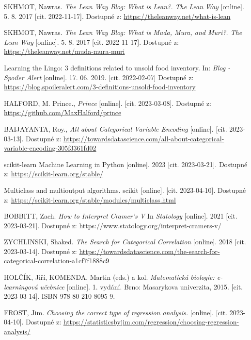 \begin{thebibliography}{1}
SKHMOT, Nawras. \textit{The Lean Way Blog: What is Lean?. The Lean Way} [online]. 5. 8. 2017 [cit. 2022-11-17]. Dostupné z: \url{https://theleanway.net/what-is-lean}

SKHMOT, Nawras. \textit{The Lean Way Blog: What is Muda, Mura, and Muri?. The Lean Way} [online]. 5. 8. 2017 [cit. 2022-11-17]. Dostupné z:
 \url{https://theleanway.net/muda-mura-muri}

Learning the Lingo: 3 definitions related to unsold food inventory. In: \textit{Blog - Spoiler Alert} [online]. 17. 06. 2019. [cit. 2022-02-07] Dostupné z: \url{https://blog.spoileralert.com/3-definitions-unsold-food-inventory}

HALFORD, M. Prince., \textit{Prince} [online]. [cit. 2023-03-08]. Dostupné z: \url{https://github.com/MaxHalford/prince}

BAIJAYANTA, Roy., \textit{All about Categorical Variable Encoding } [online]. [cit. 2023-03-13]. Dostupné z: \url{https://towardsdatascience.com/all-about-categorical-variable-encoding-305f3361fd02}

scikit-learn Machine Learning in Python [online]. 2023 [cit. 2023-03-21]. Dostupné z: \url{https://scikit-learn.org/stable/}

Multiclass and multioutput algorithms. scikit [online]. [cit. 2023-04-10]. Dostupné z: \url{https://scikit-learn.org/stable/modules/multiclass.html} 

BOBBITT, Zach. \textit{How to Interpret Cramer's V} In \textit{Statology} [online]. 2021 [cit. 2023-03-21]. Dostupné z: \url{https://www.statology.org/interpret-cramers-v/}

ZYCHLINSKI, Shaked. \textit{The Search for Categorical Correlation} [online]. 2018 [cit. 2023-03-14]. Dostupné z: \url{https://towardsdatascience.com/the-search-for-categorical-correlation-a1cf7f1888c9}

HOLČÍK, Jiří, KOMENDA, Martin (eds.) a kol. \textit{Matematická biologie: e-learningová učebnice} [online]. 
1. vydání. Brno: Masarykova univerzita, 2015. [cit. 2023-03-14]. ISBN 978-80-210-8095-9.

FROST, Jim. \textit{Choosing the correct type of regression analysis.} [online]. [cit. 2023-04-10]. Dostupné z: \url{https://statisticsbyjim.com/regression/choosing-regression-analysis/}


\end{thebibliography}
